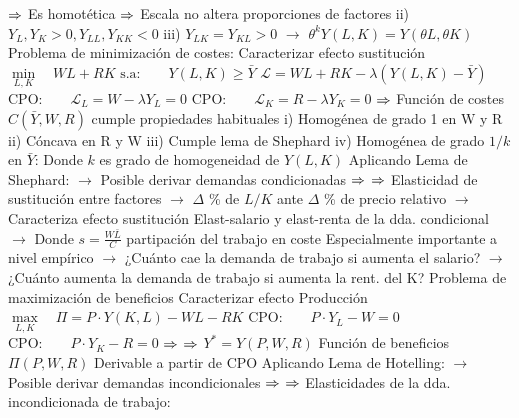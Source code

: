 \documentclass{nuevotema}
\begin{document}
\begin{esquemal}
				\4[] $\Rightarrow$ Es homotética
				\4[] $\Rightarrow$ Escala no altera proporciones de factores
				\4[] ii) $Y_L, Y_K >0, Y_{LL}, Y_{KK} < 0$
				\4[] iii) $Y_{LK} = Y_{KL} > 0$
				\4[] $\to$ $\theta^k Y(L,K) = Y(\theta L, \theta K)$
				\4 Problema de minimización de costes:
				\4[] Caracterizar efecto sustitución
				\4[] $\underset{L,K}{\min} \quad WL+RK$
				\4[] $\text{s.a:} \quad \quad Y(L,K) \geq \bar{Y}$
				\4[] $\mathcal{L} = WL+RK - \lambda (Y(L,K) - \bar{Y})$
				\4[] $\text{CPO:} \quad \quad \mathcal{L}_L = W - \lambda Y_L = 0$
				\4[] $\text{CPO:} \quad \quad \mathcal{L}_K = R - \lambda Y_K = 0$
				\4[] $\Rightarrow$ 
				\4 Función de costes $C(\bar{Y},W,R)$
				\4[] cumple propiedades habituales
				\4[] i) Homogénea de grado 1 en W y R
				\4[] ii) Cóncava en R y W
				\4[] iii) Cumple lema de Shephard
				\4[] iv) Homogénea de grado $1/k$ en $\bar{Y}$:
				\4[] Donde $k$ es grado de homogeneidad de $Y(L, K)$
				\4[] Aplicando Lema de Shephard:
				\4[] $\to$ Posible derivar demandas condicionadas
				\4[] $\Rightarrow$ 
				\4[] $\Rightarrow$ 
				\4[] Elasticidad de sustitución entre factores
				\4[] $\to$ $\Delta$ \% de $L/K$ ante $\Delta$ \% de precio relativo
				\4[] $\to$ Caracteriza efecto sustitución
				\4[] 
				\4 Elast-salario y elast-renta de la dda. condicional
				\4[] 
				\4[] $\to$ Donde $s=\frac{W\bar{L}}{C}$ partipación del trabajo en coste
				\4[] Especialmente importante a nivel empírico
				\4[] $\to$ ¿Cuánto cae la demanda de trabajo si aumenta el salario?
				\4[] $\to$ ¿Cuánto aumenta la demanda de trabajo si aumenta la rent. del K?
				\4 Problema de maximización de beneficios
				\4[] Caracterizar efecto Producción
				\4[] $\underset{L,K}{\max} \quad \Pi =P \cdot Y(K,L) - WL - RK$
				\4[] $\text{CPO:} \quad \quad P \cdot Y_L - W = 0$
				\4[] $\text{CPO:} \quad \quad P \cdot Y_K - R = 0$
				\4[] $\Rightarrow$ 
				\4[] $\Rightarrow$ $Y^*=Y(P, W, R)$
				\4 Función de beneficios $\Pi(P,W,R)$
				\4[] Derivable a partir de CPO
				\4[] Aplicando Lema de Hotelling:
				\4[] $\to$ Posible derivar demandas incondicionales
				\4[] $\Rightarrow$ 
				\4[] $\Rightarrow$ 
				\4 Elasticidades de la dda. incondicionada de trabajo:

\end{esquemal}
\end{document}
